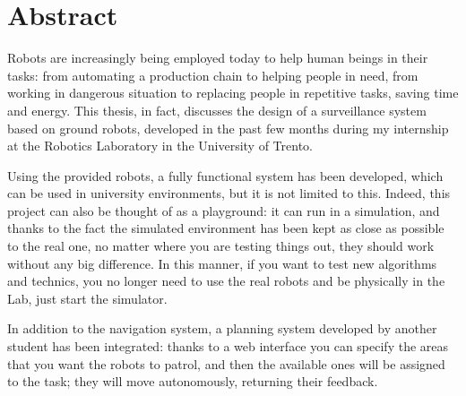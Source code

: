 
\chapter*{Abstract}
\label{abstract}

Robots are increasingly being employed today to help human beings in their tasks: from automating a production chain to helping people in need, from working in dangerous situation to replacing people in repetitive tasks, saving time and energy. This thesis, in fact, discusses the design of a surveillance system based on ground robots, developed in the past few months during my internship at the Robotics Laboratory in the University of Trento. 

Using the provided robots, a fully functional system has been developed, which can be used in university environments, but it is not limited to this. Indeed, this project can also be thought of as a playground: it can run in a simulation, and thanks to the fact the simulated environment has been kept as close as possible to the real one, no matter where you are testing things out, they should work without any big difference. In this manner,  if you want to test new algorithms and technics, you no longer need to use the real robots and be physically in the Lab, just start the simulator.

In addition to the navigation system, a planning system developed by another student has been integrated: thanks to a web interface you can specify the areas that you want the robots to patrol, and then the available ones will be assigned to the task; they will move autonomously, returning their feedback.

